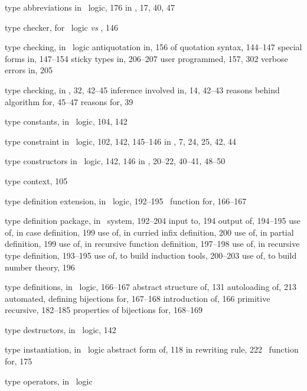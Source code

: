 \begin{theindex}
  \item type abbreviations
    \subitem in \HOL\ logic, 176
    \subitem in \ML, 17, 40, 47
  \item type checker, for \HOL\ logic {\it vs} \ML, 146
  \item type checking, in \HOL\ logic
    \subitem antiquotation in, 156
    \subitem of quotation syntax, 144--147
    \subitem special forms in, 147--154
    \subitem sticky types in, 206--207
    \subitem user programmed, 157, 302
    \subitem verbose errors in, 205
  \item type checking, in \ML, 32, 42--45
    \subitem inference involved in, 14, 42--43
    \subitem reasons behind algorithm for, 45--47
    \subitem reasons for, 39
  \item type constants, in \HOL\ logic, 104, 142
  \item type constraint
    \subitem in \HOL\ logic, 102, 142, 145--146
    \subitem in \ML, 7, 24, 25, 42, 44
  \item type constructors
    \subitem in \HOL\ logic, 142, 146
    \subitem in \ML, 20--22, 40--41, 48--50
  \item type context, 105
  \item type definition extension, in \HOL\ logic, 192--195
    \subitem \ML\ function for, 166--167
  \item type definition package, in \HOL\ system, 192--204
    \subitem input to, 194
    \subitem output of, 194--195
    \subitem use of, in case definition, 199
    \subitem use of, in curried infix definition, 200
    \subitem use of, in partial definition, 199
    \subitem use of, in recursive function definition, 197--198
    \subitem use of, in recursive type definition, 193--195
    \subitem use of, to build induction tools, 200--203
    \subitem use of, to build number theory, 196
  \item type definitions, in \HOL\ logic, 166--167
    \subitem abstract structure of, 131
    \subitem autoloading of, 213
    \subitem automated, 
    \subitem defining bijections for, 167--168
    \subitem introduction of, 166
    \subitem primitive recursive, 182--185
    \subitem properties of bijections for, 168--169
  \item type destructors, in \HOL\ logic, 142
  \item type instantiation, in \HOL\ logic
    \subitem abstract form of, 118
    \subitem in rewriting rule, 222
    \subitem \ML\ function for, 175
  \item type operators, in \HOL\ logic

\end{theindex}
